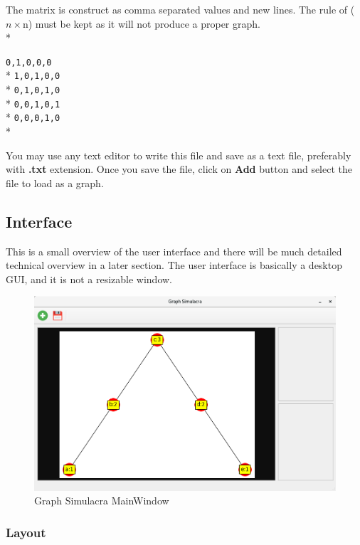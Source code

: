 \documentclass[11pt]{article}
\begin{document}
\noindent
The matrix is construct as comma separated values and new lines. The rule of \big($n\times$n) must be kept as it will not produce a proper graph. \\*

\begingroup
\centering
\verb|0,1,0,0,0|\\*
\verb|1,0,1,0,0|\\*
\verb|0,1,0,1,0|\\*
\verb|0,0,1,0,1|\\*
\verb|0,0,0,1,0|\\*

\endgroup
\vspace{5mm}

\noindent
You may use any text editor to write this file and save as a text file, preferably with \textbf{.txt} extension.
Once you save the file, click on \textbf{Add} button and select the file to load as a graph. \\


\subsection{Interface}

This is a small overview of the user interface and there will be much detailed technical overview in a later section. The user interface is basically a desktop GUI, and it is not a resizable window. 

\begin{figure}[ht]
\centering
     \includegraphics[width=1.0\textwidth]{window.png}
      \caption{Graph Simulacra MainWindow}
       \label{normal_case}
\end{figure}

\subsubsection{Layout}
\end{document}
